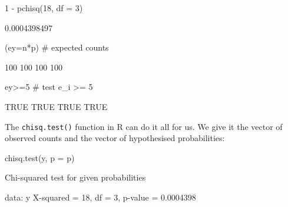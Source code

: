 \documentclass[a4paper]{article}
\begin{document}
\begin{Schunk}
\begin{Sinput}
1 - pchisq(18, df = 3)
\end{Sinput}
\begin{Soutput}
[1] 0.0004398497
\end{Soutput}
\begin{Sinput}
(ey=n*p) # expected counts
\end{Sinput}
\begin{Soutput}
[1] 100 100 100 100
\end{Soutput}
\begin{Sinput}
ey>=5 # test e_i >= 5
\end{Sinput}
\begin{Soutput}
[1] TRUE TRUE TRUE TRUE
\end{Soutput}
\end{Schunk}
The \lstinline|chisq.test()| function in R can do it all for us. We give it the vector of observed counts and the vector of hypothesised probabilities:
\begin{Schunk}
\begin{Sinput}
chisq.test(y, p = p)
\end{Sinput}
\begin{Soutput}

	Chi-squared test for given probabilities

data:  y
X-squared = 18, df = 3, p-value = 0.0004398
\end{Soutput}
\end{Schunk}
\end{document}
